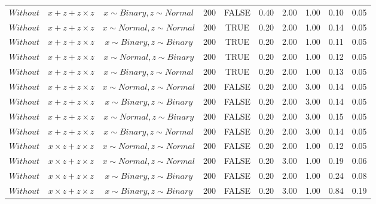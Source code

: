 \begin{longtable}{lccccccccc}
  $Without$ & $\textit{x} + \textit{z} + \textit{z} \times \textit{z}$ & $\textit{x} \sim Binary, \textit{z} \sim Normal$ & 200 & FALSE & 0.40 & 2.00 & 1.00 & 0.10 & 0.05 \\ 
  $Without$ & $\textit{x} + \textit{z} + \textit{z} \times \textit{z}$ & $\textit{x} \sim Normal , \textit{z} \sim Normal$ & 200 & TRUE & 0.20 & 2.00 & 1.00 & 0.14 & 0.05 \\ 
  $Without$ & $\textit{x} + \textit{z} + \textit{z} \times \textit{z}$ & $\textit{x} \sim Binary, \textit{z} \sim Binary$ & 200 & TRUE & 0.20 & 2.00 & 1.00 & 0.11 & 0.05 \\ 
  $Without$ & $\textit{x} + \textit{z} + \textit{z} \times \textit{z}$ & $\textit{x} \sim Normal, \textit{z} \sim Binary$ & 200 & TRUE & 0.20 & 2.00 & 1.00 & 0.12 & 0.05 \\ 
  $Without$ & $\textit{x} + \textit{z} + \textit{z} \times \textit{z}$ & $\textit{x} \sim Binary, \textit{z} \sim Normal$ & 200 & TRUE & 0.20 & 2.00 & 1.00 & 0.13 & 0.05 \\ 
  $Without$ & $\textit{x} + \textit{z} + \textit{z} \times \textit{z}$ & $\textit{x} \sim Normal , \textit{z} \sim Normal$ & 200 & FALSE & 0.20 & 2.00 & 3.00 & 0.14 & 0.05 \\ 
  $Without$ & $\textit{x} + \textit{z} + \textit{z} \times \textit{z}$ & $\textit{x} \sim Binary, \textit{z} \sim Binary$ & 200 & FALSE & 0.20 & 2.00 & 3.00 & 0.14 & 0.05 \\ 
  $Without$ & $\textit{x} + \textit{z} + \textit{z} \times \textit{z}$ & $\textit{x} \sim Normal, \textit{z} \sim Binary$ & 200 & FALSE & 0.20 & 2.00 & 3.00 & 0.15 & 0.05 \\ 
  $Without$ & $\textit{x} + \textit{z} + \textit{z} \times \textit{z}$ & $\textit{x} \sim Binary, \textit{z} \sim Normal$ & 200 & FALSE & 0.20 & 2.00 & 3.00 & 0.14 & 0.05 \\ 
  $Without$ & $\textit{x} \times \textit{z} + \textit{z} \times \textit{z}$ & $\textit{x} \sim Normal , \textit{z} \sim Normal$ & 200 & FALSE & 0.20 & 2.00 & 1.00 & 0.12 & 0.05 \\ 
  $Without$ & $\textit{x} \times \textit{z} + \textit{z} \times \textit{z}$ & $\textit{x} \sim Normal , \textit{z} \sim Normal$ & 200 & FALSE & 0.20 & 3.00 & 1.00 & 0.19 & 0.06 \\ 
  $Without$ & $\textit{x} \times \textit{z} + \textit{z} \times \textit{z}$ & $\textit{x} \sim Binary, \textit{z} \sim Binary$ & 200 & FALSE & 0.20 & 2.00 & 1.00 & 0.24 & 0.08 \\ 
  $Without$ & $\textit{x} \times \textit{z} + \textit{z} \times \textit{z}$ & $\textit{x} \sim Binary, \textit{z} \sim Binary$ & 200 & FALSE & 0.20 & 3.00 & 1.00 & 0.84 & 0.19 \\ 

\end{longtable}
